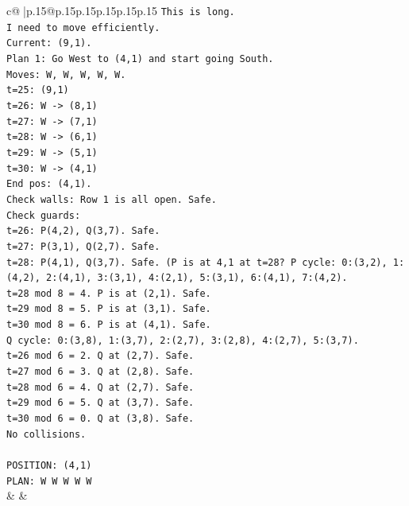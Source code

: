 \documentclass{article}
\begin{document}
{\begin{supertabular}{c@{$\;$}|p{.15\linewidth}@{}p{.15\linewidth}p{.15\linewidth}p{.15\linewidth}p{.15\linewidth}p{.15\linewidth}}
{{{\texttt{This is long.} \\
\texttt{I need to move efficiently.} \\
\texttt{Current: (9,1).} \\
\texttt{Plan 1: Go West to (4,1) and start going South.} \\
\texttt{Moves: W, W, W, W, W.} \\
\texttt{t=25: (9,1)} \\
\texttt{t=26: W {-}> (8,1)} \\
\texttt{t=27: W {-}> (7,1)} \\
\texttt{t=28: W {-}> (6,1)} \\
\texttt{t=29: W {-}> (5,1)} \\
\texttt{t=30: W {-}> (4,1)} \\
\texttt{End pos: (4,1).} \\
\texttt{Check walls: Row 1 is all open. Safe.} \\
\texttt{Check guards:} \\
\texttt{t=26: P(4,2), Q(3,7). Safe.} \\
\texttt{t=27: P(3,1), Q(2,7). Safe.} \\
\texttt{t=28: P(4,1), Q(3,7). Safe. (P is at 4,1 at t=28? P cycle: 0:(3,2), 1:(4,2), 2:(4,1), 3:(3,1), 4:(2,1), 5:(3,1), 6:(4,1), 7:(4,2).} \\
\texttt{t=28 mod 8 = 4. P is at (2,1). Safe.} \\
\texttt{t=29 mod 8 = 5. P is at (3,1). Safe.} \\
\texttt{t=30 mod 8 = 6. P is at (4,1). Safe.} \\
\texttt{Q cycle: 0:(3,8), 1:(3,7), 2:(2,7), 3:(2,8), 4:(2,7), 5:(3,7).} \\
\texttt{t=26 mod 6 = 2. Q at (2,7). Safe.} \\
\texttt{t=27 mod 6 = 3. Q at (2,8). Safe.} \\
\texttt{t=28 mod 6 = 4. Q at (2,7). Safe.} \\
\texttt{t=29 mod 6 = 5. Q at (3,7). Safe.} \\
\texttt{t=30 mod 6 = 0. Q at (3,8). Safe.} \\
\texttt{No collisions.} \\
\\ 
\texttt{POSITION: (4,1)} \\
\texttt{PLAN: W W W W W} \\
            }
        }
    }
    & & \\ \\


\end{supertabular}}
\end{document}
